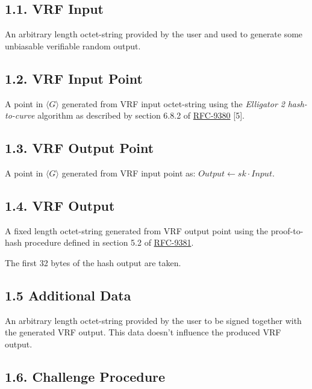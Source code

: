 \documentclass[
]{article}
\begin{document}
\subsection{1.1. VRF Input}\label{vrf-input}

An arbitrary length octet-string provided by the user and used to
generate some unbiasable verifiable random output.

\subsection{1.2. VRF Input Point}\label{vrf-input-point}

A point in \(\langle G \rangle\) generated from VRF input octet-string
using the \emph{Elligator 2} \emph{hash-to-curve} algorithm as described
by section 6.8.2 of
\href{https://datatracker.ietf.org/doc/rfc9380}{RFC-9380} {[}5{]}.

\subsection{1.3. VRF Output Point}\label{vrf-output-point}

A point in \(\langle G \rangle\) generated from VRF input point as:
\(Output \gets sk \cdot Input\).

\subsection{1.4. VRF Output}\label{vrf-output}

A fixed length octet-string generated from VRF output point using the
proof-to-hash procedure defined in section 5.2 of
\href{https://datatracker.ietf.org/doc/rfc9381}{RFC-9381}.

The first 32 bytes of the hash output are taken.

\subsection{1.5 Additional Data}\label{additional-data}

An arbitrary length octet-string provided by the user to be signed
together with the generated VRF output. This data doesn't influence the
produced VRF output.

\subsection{1.6. Challenge Procedure}\label{challenge-procedure}
\end{document}
